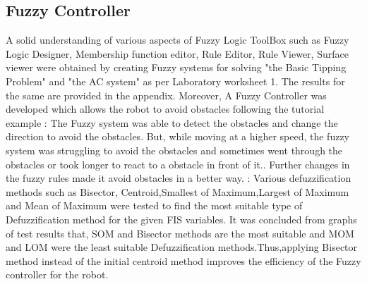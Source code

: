 \documentclass{l4proj}
\begin{document}
\subsection{Fuzzy Controller}
A solid understanding of various aspects of Fuzzy Logic ToolBox such as Fuzzy Logic Designer, Membership function editor, Rule Editor, Rule Viewer, Surface viewer were obtained by creating Fuzzy systems for solving "the Basic Tipping Problem" and "the AC system" as per Laboratory worksheet 1. The results for the same are provided in the appendix. Moreover, A Fuzzy Controller was developed which allows the robot to avoid obstacles following the tutorial example : The Fuzzy system was able to detect the obstacles and change the direction to avoid the obstacles. But, while moving at a higher speed, the fuzzy system was struggling to avoid the obstacles and sometimes went through the obstacles or took longer to react to a obstacle in front of it.. Further changes in the fuzzy rules made it avoid obstacles in a better way.  : Various defuzzification methods such as Bisector, Centroid,Smallest of Maximum,Largest of Maximum and Mean of Maximum were tested to find the most suitable type of Defuzzification method for the given FIS variables. It was concluded from graphs of test results that, SOM and Bisector methods are the most suitable and MOM and LOM were the least suitable Defuzzification methods.Thus,applying Bisector method instead of the initial centroid method improves the efficiency of the Fuzzy controller for the robot.
\end{document}
